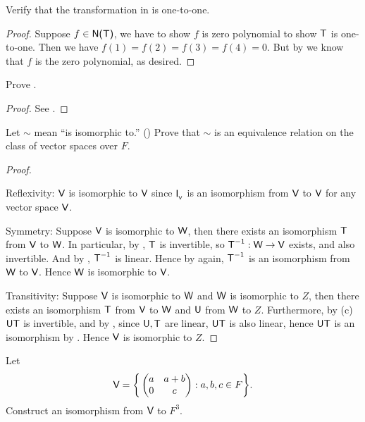 \begin{exercise} \label{exercise 2.4.11}
Verify that the transformation in  is one-to-one.
\end{exercise}

\begin{proof}
Suppose \(f \in \textsf{N(T)}\), we have to show \(f\) is zero polynomial to show \(\textsf{T}\) is one-to-one.
Then we have \(f(1) = f(2) = f(3) = f(4) = 0\).
But by  we know that \(f\) is the zero polynomial, as desired.
\end{proof}

\begin{exercise} \label{exercise 2.4.12}
Prove .
\end{exercise}

\begin{proof}
See .
\end{proof}

\begin{exercise} \label{exercise 2.4.13}
Let \(\sim\) mean ``is isomorphic to.'' ()
Prove that \(\sim\) is an equivalence relation on the class of vector spaces over \(F\).
\end{exercise}

\begin{proof}\ 

Reflexivity: \(\textsf{V}\) is isomorphic to \(\textsf{V}\) since \(\textsf{I}_{_{\textsf{V}}}\) is an isomorphism from \(\textsf{V}\) to \(\textsf{V}\) for any vector space \(\textsf{V}\).

Symmetry: Suppose \(\textsf{V}\) is isomorphic to \(\textsf{W}\), then there exists an isomorphism \(\textsf{T}\) from \(\textsf{V}\) to \(\textsf{W}\).
In particular, by , \(\textsf{T}\) is invertible, so \(\textsf{T}^{-1} : \textsf{W} \to \textsf{V}\) exists, and also invertible.
And by , \(\textsf{T}^{-1}\) is linear.
Hence by  again, \(\textsf{T}^{-1}\) is an isomorphism from \(\textsf{W}\) to \(\textsf{V}\).
Hence \(\textsf{W}\) is isomorphic to \(\textsf{V}\).

Transitivity: Suppose \(\textsf{V}\) is isomorphic to \(\textsf{W}\) and \(\textsf{W}\) is isomorphic to \(Z\), then there exists an isomorphism \(\textsf{T}\) from \(\textsf{V}\) to \(\textsf{W}\) and \(\textsf{U}\) from \(\textsf{W}\) to \(Z\).
Furthermore, by (c) \(\textsf{U}\textsf{T}\) is invertible, and by , since \(\textsf{U}, \textsf{T}\) are linear, \(\textsf{U}\textsf{T}\) is also linear, hence \(\textsf{U}\textsf{T}\) is an isomorphism by .
Hence \(\textsf{V}\) is isomorphic to \(Z\).
\end{proof}

\begin{exercise} \label{exercise 2.4.14}
Let
\[
    \textsf{V} = \bigg\{ \begin{pmatrix} a & a + b \\ 0 & c \end{pmatrix} : a, b, c \in F \bigg\}.
\]
Construct an isomorphism from \(\textsf{V}\) to \(F^3\).
\end{exercise}

